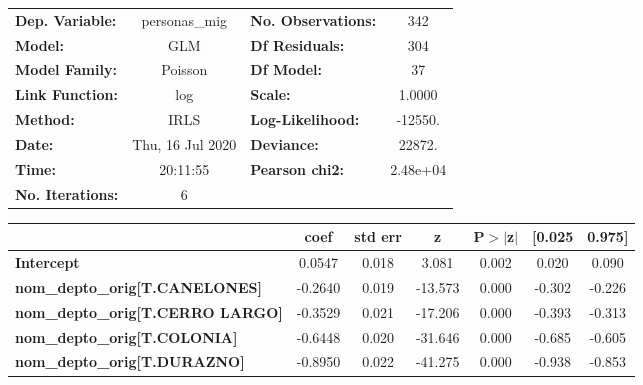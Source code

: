 \begin{center}
\begin{tabular}{lclc}
\toprule
\textbf{Dep. Variable:}                     &  personas\_mig   & \textbf{  No. Observations:  } &      342    \\
\textbf{Model:}                             &       GLM        & \textbf{  Df Residuals:      } &      304    \\
\textbf{Model Family:}                      &     Poisson      & \textbf{  Df Model:          } &       37    \\
\textbf{Link Function:}                     &       log        & \textbf{  Scale:             } &    1.0000   \\
\textbf{Method:}                            &       IRLS       & \textbf{  Log-Likelihood:    } &   -12550.   \\
\textbf{Date:}                              & Thu, 16 Jul 2020 & \textbf{  Deviance:          } &    22872.   \\
\textbf{Time:}                              &     20:11:55     & \textbf{  Pearson chi2:      } &  2.48e+04   \\
\textbf{No. Iterations:}                    &        6         & \textbf{                     } &             \\
\bottomrule
\end{tabular}
\begin{tabular}{lcccccc}
                                            & \textbf{coef} & \textbf{std err} & \textbf{z} & \textbf{P$> |$z$|$} & \textbf{[0.025} & \textbf{0.975]}  \\
\midrule
\textbf{Intercept}                          &       0.0547  &        0.018     &     3.081  &         0.002        &        0.020    &        0.090     \\
\textbf{nom\_depto\_orig[T.CANELONES]}      &      -0.2640  &        0.019     &   -13.573  &         0.000        &       -0.302    &       -0.226     \\
\textbf{nom\_depto\_orig[T.CERRO LARGO]}    &      -0.3529  &        0.021     &   -17.206  &         0.000        &       -0.393    &       -0.313     \\
\textbf{nom\_depto\_orig[T.COLONIA]}        &      -0.6448  &        0.020     &   -31.646  &         0.000        &       -0.685    &       -0.605     \\
\textbf{nom\_depto\_orig[T.DURAZNO]}        &      -0.8950  &        0.022     &   -41.275  &         0.000        &       -0.938    &       -0.853     \\

\end{tabular}
\end{center}

